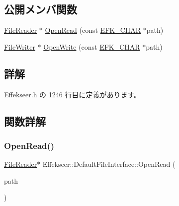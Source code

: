 \subsection*{公開メンバ関数}
\begin{DoxyCompactItemize}
\item 
\mbox{\hyperlink{class_effekseer_1_1_file_reader}{File\+Reader}} $\ast$ \mbox{\hyperlink{class_effekseer_1_1_default_file_interface_a03d6224d1eb0124a21f42c578e447d51}{Open\+Read}} (const \mbox{\hyperlink{_effekseer_8h_a50b026abea014b47854bcd835b3b6233}{E\+F\+K\+\_\+\+C\+H\+AR}} $\ast$path)
\item 
\mbox{\hyperlink{class_effekseer_1_1_file_writer}{File\+Writer}} $\ast$ \mbox{\hyperlink{class_effekseer_1_1_default_file_interface_aecbcd4350ca701360dcea88a2c5f9c64}{Open\+Write}} (const \mbox{\hyperlink{_effekseer_8h_a50b026abea014b47854bcd835b3b6233}{E\+F\+K\+\_\+\+C\+H\+AR}} $\ast$path)
\end{DoxyCompactItemize}


\subsection{詳解}


 Effekseer.\+h の 1246 行目に定義があります。



\subsection{関数詳解}
\mbox{\label{class_effekseer_1_1_default_file_interface_a03d6224d1eb0124a21f42c578e447d51}} 
\subsubsection{\texorpdfstring{Open\+Read()}{OpenRead()}}
{\footnotesize\ttfamily \mbox{\hyperlink{class_effekseer_1_1_file_reader}{File\+Reader}}$\ast$ Effekseer\+::\+Default\+File\+Interface\+::\+Open\+Read (\begin{DoxyParamCaption}\item[{const \mbox{\hyperlink{_effekseer_8h_a50b026abea014b47854bcd835b3b6233}{E\+F\+K\+\_\+\+C\+H\+AR}} $\ast$}]{path }\end{DoxyParamCaption})\hspace{0.3cm}{\ttfamily [virtual]}}



